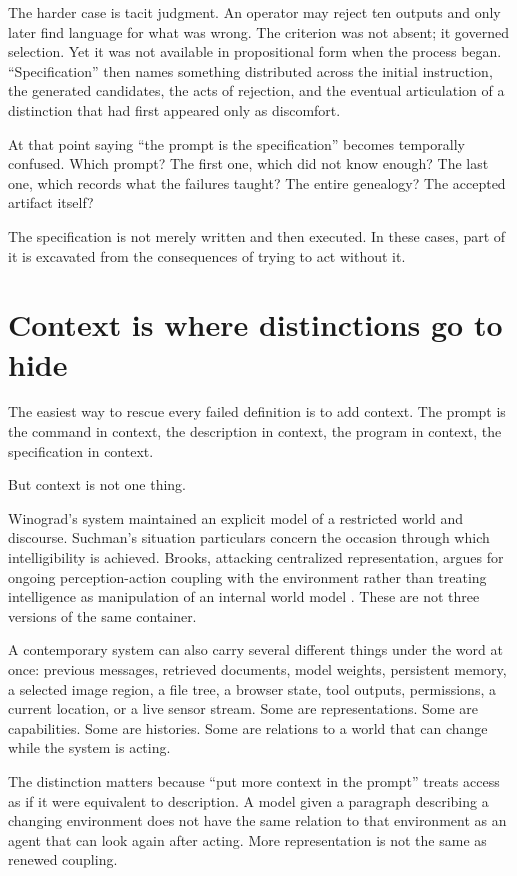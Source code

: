 \documentclass[11pt]{article}
\begin{document}
The harder case is tacit judgment. An operator may reject ten outputs and only later find language for what was wrong. The criterion was not absent; it governed selection. Yet it was not available in propositional form when the process began. ``Specification'' then names something distributed across the initial instruction, the generated candidates, the acts of rejection, and the eventual articulation of a distinction that had first appeared only as discomfort.

At that point saying ``the prompt is the specification'' becomes temporally confused. Which prompt? The first one, which did not know enough? The last one, which records what the failures taught? The entire genealogy? The accepted artifact itself?

The specification is not merely written and then executed. In these cases, part of it is excavated from the consequences of trying to act without it.

\section{Context is where distinctions go to hide}

The easiest way to rescue every failed definition is to add context. The prompt is the command in context, the description in context, the program in context, the specification in context.

But context is not one thing.

Winograd's system maintained an explicit model of a restricted world and discourse. Suchman's situation particulars concern the occasion through which intelligibility is achieved. Brooks, attacking centralized representation, argues for ongoing perception-action coupling with the environment rather than treating intelligence as manipulation of an internal world model \parencite{brooks1991intelligence}. These are not three versions of the same container.

A contemporary system can also carry several different things under the word at once: previous messages, retrieved documents, model weights, persistent memory, a selected image region, a file tree, a browser state, tool outputs, permissions, a current location, or a live sensor stream. Some are representations. Some are capabilities. Some are histories. Some are relations to a world that can change while the system is acting.

The distinction matters because ``put more context in the prompt'' treats access as if it were equivalent to description. A model given a paragraph describing a changing environment does not have the same relation to that environment as an agent that can look again after acting. More representation is not the same as renewed coupling.
\end{document}
